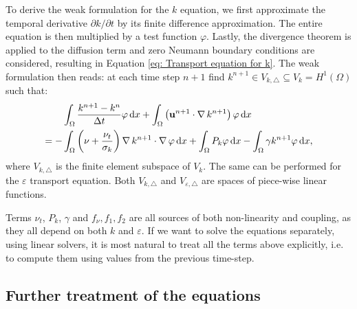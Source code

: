 To derive the weak formulation for the \(k\) equation, we first approximate the temporal derivative \(\partial k / \partial t\) by its finite difference approximation. The entire equation is then multiplied by a test function \(\varphi\). Lastly, the divergence theorem is applied to the diffusion term and zero Neumann boundary conditions are considered, resulting in Equation \eqref{eq: Transport equation for k}. The weak formulation then reads: at each time step \(n+1\) find \(k^{n+1} \in V_{k,\triangle} \subseteq V_k = H^1(\Omega)\) such that:
\begin{equation}\label{eq: Transport equation for k}
    \begin{split}
        &\int_{\Omega} \frac{k^{n+1} - k^n}{\Delta t} \varphi \dx 
        + \int_{\Omega} \left( \mathbf{u}^{n+1} \cdot \Grad k^{n+1} \right) \varphi \dx
        \\
        =
        - &\int_{\Omega} \left( \nu + \frac{\nu_t}{\sigma_k}\right) \Grad k^{n+1} \cdot \Grad \varphi \dx 
        + \int_{\Omega} P_k \varphi \dx 
        - \int_{\Omega} \gamma k^{n+1} \varphi \dx,
    \end{split}
\end{equation}
where \(V_{k, \triangle}\) is the finite element subspace of \(V_k\). The same can be performed for the \(\varepsilon\) transport equation. Both \(V_{k, \triangle}\) and \(V_{\varepsilon, \triangle}\) are spaces of piece-wise linear functions.

Terms \(\nu_t\), \(P_k\), \(\gamma\) and \(f_\nu, f_1, f_2\) are all sources of both non-linearity and coupling, as they all depend on both \(k\) and \(\varepsilon\). If we want to solve the equations separately, using linear solvers, it is most natural to treat all the terms above explicitly, i.e. to compute them using values from the previous time-step. 

\subsection{Further treatment of the equations}

